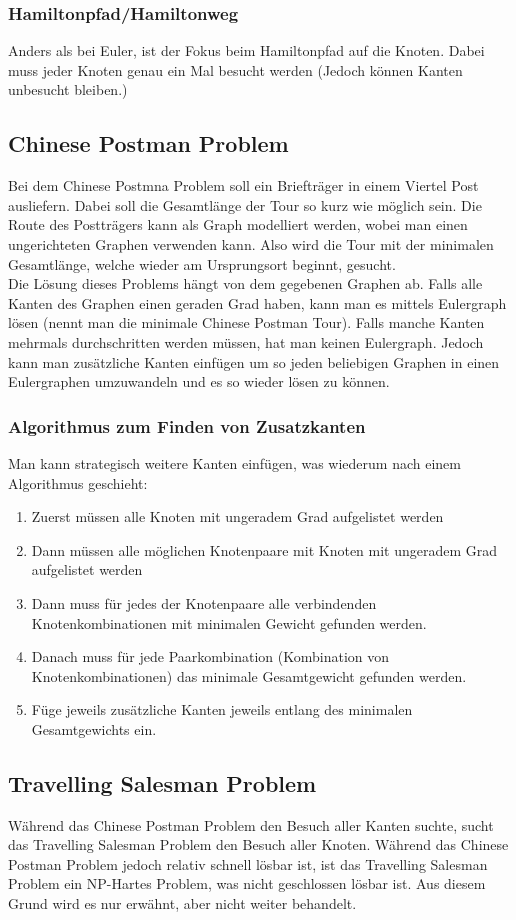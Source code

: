 \documentclass{article}
\begin{document}
	\subsubsection{Hamiltonpfad/Hamiltonweg}
	Anders als bei Euler, ist der Fokus beim Hamiltonpfad auf die Knoten. Dabei muss jeder Knoten genau ein Mal besucht werden (Jedoch können Kanten unbesucht bleiben.)
	\subsection{Chinese Postman Problem}
	Bei dem Chinese Postmna Problem soll ein Briefträger in einem Viertel Post ausliefern. Dabei soll die Gesamtlänge der Tour so kurz wie möglich sein. Die Route des Postträgers kann als Graph modelliert werden, wobei man einen ungerichteten Graphen verwenden kann. Also wird die Tour mit der minimalen Gesamtlänge, welche wieder am Ursprungsort beginnt, gesucht. \\
	Die Lösung dieses Problems hängt von dem gegebenen Graphen ab. Falls alle Kanten des Graphen einen geraden Grad haben, kann man es mittels Eulergraph lösen (nennt man die minimale Chinese Postman Tour). Falls manche Kanten mehrmals durchschritten werden müssen, hat man keinen Eulergraph. Jedoch kann man zusätzliche Kanten einfügen um so jeden beliebigen Graphen in einen Eulergraphen umzuwandeln und es so wieder lösen zu können.
	\subsubsection{Algorithmus zum Finden von Zusatzkanten}
	Man kann strategisch weitere Kanten einfügen, was wiederum nach einem Algorithmus geschieht:
	\begin{enumerate}
		\item{Zuerst müssen alle Knoten mit ungeradem Grad aufgelistet werden}
		\item{Dann müssen alle möglichen Knotenpaare mit Knoten mit ungeradem Grad aufgelistet werden}
		\item{Dann muss für jedes der Knotenpaare alle verbindenden Knotenkombinationen mit minimalen Gewicht gefunden werden.}
		\item{Danach muss für jede Paarkombination (Kombination von Knotenkombinationen) das minimale Gesamtgewicht gefunden werden.}
		\item{Füge jeweils zusätzliche Kanten jeweils entlang des minimalen Gesamtgewichts ein.}
	\end{enumerate}
	\subsection{Travelling Salesman Problem}
	Während das Chinese Postman Problem den Besuch aller Kanten suchte, sucht das Travelling Salesman Problem den Besuch aller Knoten. Während das Chinese Postman Problem jedoch relativ schnell lösbar ist, ist das Travelling Salesman Problem ein NP-Hartes Problem, was nicht geschlossen lösbar ist. Aus diesem Grund wird es nur erwähnt, aber nicht weiter behandelt.
\end{document}
